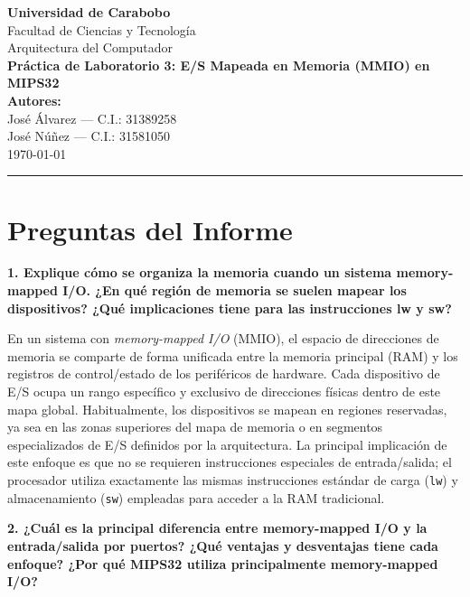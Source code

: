 \documentclass[11pt,a4paper]{article}
\begin{document}
\begin{center}
    {\Large \textbf{Universidad de Carabobo}} \\[0.2cm]
    {\large Facultad de Ciencias y Tecnología} \\[0.2cm]
    {\normalsize Arquitectura del Computador} \\[0.5cm]
    {\Large \textbf{Práctica de Laboratorio 3: E/S Mapeada en Memoria (MMIO) en MIPS32}} \\[0.5cm]
    
    \textbf{Autores:} \\
    José Álvarez --- C.I.: 31389258 \\
    José Núñez --- C.I.: 31581050 \\
    \vspace{0.3cm}
    \today
\end{center}

\hrule
\vspace{0.5cm}

\section*{Preguntas del Informe}

\noindent\textbf{1. Explique cómo se organiza la memoria cuando un sistema memory-mapped I/O. ¿En qué región de memoria se suelen mapear los dispositivos? ¿Qué implicaciones tiene para las instrucciones lw y sw?}

\vspace{0.5cm}
En un sistema con \textit{memory-mapped I/O} (MMIO), el espacio de direcciones de memoria se comparte de forma unificada entre la memoria principal (RAM) y los registros de control/estado de los periféricos de hardware. Cada dispositivo de E/S ocupa un rango específico y exclusivo de direcciones físicas dentro de este mapa global. Habitualmente, los dispositivos se mapean en regiones reservadas, ya sea en las zonas superiores del mapa de memoria o en segmentos especializados de E/S definidos por la arquitectura. La principal implicación de este enfoque es que no se requieren instrucciones especiales de entrada/salida; el procesador utiliza exactamente las mismas instrucciones estándar de carga (\texttt{lw}) y almacenamiento (\texttt{sw}) empleadas para acceder a la RAM tradicional.

\vspace{0.4cm}
\noindent\textbf{2. ¿Cuál es la principal diferencia entre memory-mapped I/O y la entrada/salida por puertos? ¿Qué ventajas y desventajas tiene cada enfoque? ¿Por qué MIPS32 utiliza principalmente memory-mapped I/O?}
\end{document}
